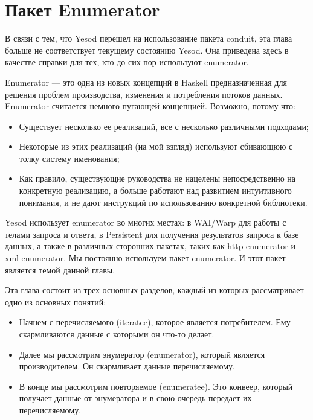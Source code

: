 \chapter{Пакет Enumerator}\label{chap:enumerator}


\begin{remark}
В связи с тем, что Yesod перешел на использование пакета conduit, эта глава больше не соответствует текущему состоянию Yesod. Она приведена здесь в качестве справки для тех, кто до сих пор используют enumerator.
\end{remark}

Enumerator --- это одна из новых концепций в Haskell предназначенная для решения проблем производства, изменения и потребления потоков данных. Enumerator считается немного пугающей концепцией. Возможно, потому что:

\begin{itemize}
\item Существует несколько ее реализаций, все с несколько различными подходами;
\item Некоторые из этих реализаций (на мой взгляд) используют сбивающюю с толку систему именования;
\item Как правило, существующие руководства не нацелены непосредственно на конкретную реализацию, а больше работают над развитием интуитивного понимания, и не дают инструкций по использованию конкретной библиотеки.
\end{itemize}

Yesod использует enumerator во многих местах: в WAI/Warp для работы с телами запроса и ответа, в Persistent для получения результатов запроса к базе данных, а также в различных сторонних пакетах, таких как http-enumerator и xml-enumerator. Мы постоянно используем пакет enumerator. И этот пакет является темой данной главы.

Эта глава состоит из трех основных разделов, каждый из которых рассматривает одно из основных понятий:

\begin{itemize}
\item Начнем с перечисляемого (iteratee), которое является потребителем. Ему скармливаются данные с которыми он что-то делает.
\item Далее мы рассмотрим энумератор (enumerator), который является производителем. Он скармливает данные перечисляемому.
\item В конце мы рассмотрим повторяемое (enumeratee). Это конвеер, который получает данные от энумератора и в свою очередь передает их перечисляемому.
\end{itemize}

